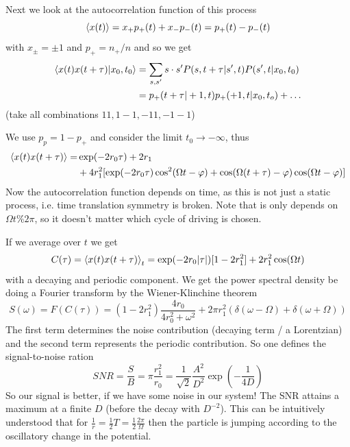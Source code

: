 \documentclass{notebook}
\begin{document}
Next we look at the autocorrelation function of this process
%
\begin{equation}
	\expval{x(t)} = x_+ p_+(t) + x_- p_-(t) = p_+(t) - p_-(t)
\end{equation}
%
with $x_{\pm} = \pm 1$ and $p_+ = n_+ / n$ and so we get
%
\begin{align*}
	\expval{x(t) x(t+\tau) | x_0, t_0} &= \sum_{s,s'} s \cdot s' P(s,t+\tau | s', t) P(s',t|x_0,t_0) \\
	&= p_+(t+\tau | +1, t) p_+(+1, t|x_0,t_o) + \dots
\end{align*}
%
(take all combinations $11, 1-1, -11,-1-1$)

We use $p_p = 1-p_+$ and consider the limit $t_0 \to -\infty$, thus
%
\begin{align*}
	\expval{x(t) x(t+\tau)} =& \exp(-2 r_0 \tau) + 2 r_1 \\
	&+ 4 r_1^2 [\exp(-2 r_0 \tau) \cos^2(\Omega t - \varphi) + \cos(\Omega (t+\tau) - \varphi) \cos(\Omega t - \varphi)]
\end{align*}
%
Now the autocorrelation function depends on time, as this is not just a static process, i.e. time translation symmetry is broken. Note that is only depends on $\Omega t \% 2 \pi$, so it doesn't matter which cycle of driving is chosen.

If we average over $t$ we get
%
\begin{equation}
	C(\tau) = 	\expval{x(t) x(t+\tau)}_t = \exp(-2r_0 |\tau|) [1 - 2 r_1^2] + 2 r_1^2 \cos(\Omega t)
\end{equation}
%
with a decaying and periodic component. We get the power spectral density be doing a Fourier transform by the Wiener-Klinchine theorem
%
\begin{equation}
	S(\omega) = F(C(\tau)) = (1- 2 r_1^2) \frac{4 r_0}{4 r_0^2 + \omega^2} + 2 \pi r_1^2 (\delta(\omega-\Omega) + \delta(\omega + \Omega))
\end{equation}
%
The first term determines the noise contribution (decaying term / a Lorentzian) and the second term represents the periodic contribution. So one defines the signal-to-noise ration
%
\begin{equation}
	SNR = \frac{S}{B} = \pi \frac{r_1^2}{r_0} = \frac{1}{\sqrt{2}} \frac{A^2}{D^2} \exp(-\frac{1}{4 D})
\end{equation}
%
So our signal is better, if we have some noise in our system! The SNR attains a maximum at a finite $D$ (before the decay with $D^{-2}$). This can be intuitively understood that for $\frac{1}{r} = \frac{1}{2} T = \frac{1}{2} \frac{2 \pi}{\Omega}$ then the particle is jumping according to the oscillatory change in the potential. 
\end{document}
